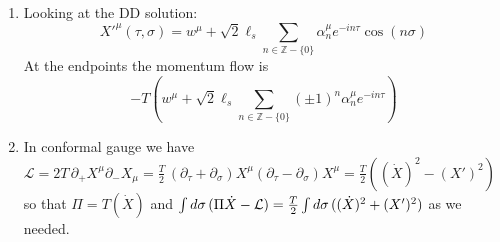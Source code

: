 \documentclass[11pt, class=article, crop=false]{standalone}
\begin{document}
\begin{enumerate}
		Further: 
		\begin{equation}
			\begin{aligned}
				{X'}^\mu(\tau, \sigma)|_{\sigma = \pi} &= \ell_s^2 (p^\mu - \bar p^\mu) + \frac{\ell_s}{\sqrt 2} \sum_{n} (\alpha_n^\mu  e^{-i \pi n}- \bar \alpha_{n}^\mu e^{i \pi n}) e^{- i n \tau} \to \sum_{n} \alpha_n^\mu  ( e^{-i \pi n}-  \frac{1+\lambda}{1-\lambda} e^{i \pi n}) e^{- i n \tau} 
				\\{\dot X}^\mu(\tau, \sigma)|_{\sigma = \pi} &=  \ell_s^2 (p^\mu + \bar p^\mu) + \frac{\ell_s}{\sqrt 2} \sum_{n} (\alpha_n^\mu e^{-i \pi n} + \bar \alpha_n^\mu e^{i \pi n}) e^{-in\tau} \to \sum_{n} \alpha_n^\mu  ( e^{-i \pi n}+  \frac{1+\lambda}{1-\lambda} e^{i \pi n}) e^{- i n \tau} 
			\end{aligned}
		\end{equation}
		This gives:
		\begin{equation}
			(1+ \lambda) e^{-i\pi n} - (1-\lambda) \frac{1+\lambda}{1-\lambda} e^{i \pi n} = 0 \Rightarrow \sin(\pi n) = 0 \Rightarrow n \in \mathbb Z.
		\end{equation}
		
		The full equation is then 
		\begin{equation}
			X^\mu = x^\mu + \frac{2\ell_s^2 p^\mu}{1-\lambda} (\tau - \lambda \sigma) + \frac{i \sqrt 2 \ell_s}{ (1-\lambda)} \sum_{n \in \mathbb Z - \{0\}} \frac{\alpha_n^\mu}{n} e^{-i n \tau} (\cos(\sigma n) + i \lambda \sin(\sigma n))
		\end{equation}
		
		 Clearly as $\lambda \to 0$ we recover Neumann boundary conditions. On the other hand as $\lambda \to \infty$ we see that the endpoint of the string is constrained to be unable to move and we indeed recover Dirichlet. 
		 
		 \item Looking at the DD solution:
		 \begin{equation}
		 	{X'}^\mu(\tau, \sigma) = w^\mu + \sqrt{2} \ell_s \sum_{n\in \mathbb Z - \{0\}} \alpha^\mu_n e^{-i n \tau} \cos(n \sigma)
		 \end{equation}
		 At the endpoints the momentum flow is 
		 \begin{equation}
		 	-T \left( w^\mu + \sqrt2 \ell_s \sum_{n \in \mathbb Z - \{0\}} (\pm 1)^n \alpha^\mu_n e^{-in\tau} \right)
		 \end{equation}
		 
		 \item In conformal gauge we have $\mathcal L = 2 T\, \partial_+ X^\mu \partial_- X_\mu = \frac{T}{2}\, (\partial_\tau + \partial_\sigma) X^\mu (\partial_\tau - \partial_\sigma) X^\mu = \frac{T}{2} ((\dot X)^2 - (X')^2) $ so that $\Pi = T (\dot X)$ and $\int d\sigma\, (\Pi \dot X - \mathcal{L}) = \frac T2 \int d\sigma\, ((\dot X)^2 + (X')^2)$ as we needed. 
		 

\end{enumerate}
\end{document}
